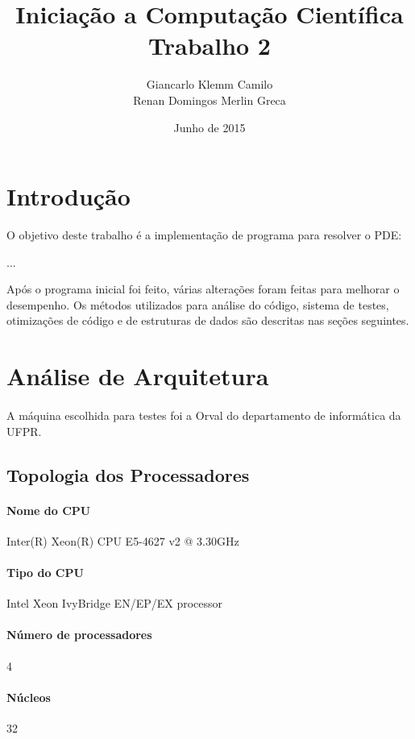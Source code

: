 \documentclass[12pt]{article}
\title{Iniciação a Computação Científica\\Trabalho 2}
\author{
	Giancarlo Klemm Camilo \\
	Renan Domingos Merlin Greca
}
\date{Junho de 2015}
\begin{document}
\maketitle
\newpage	

\tableofcontents
\newpage

\section{Introdução}
O objetivo deste trabalho é a implementação de programa para resolver o PDE:

...

Após o programa inicial foi feito, várias alterações foram feitas para melhorar o desempenho. Os métodos utilizados para análise do código, sistema de testes, otimizações de código e de estruturas de dados são descritas nas seções seguintes.

\newpage

\section{Análise de Arquitetura}
\paragraph{}
A máquina escolhida para testes foi a Orval do departamento de informática da UFPR.

\subsection{Topologia dos Processadores}
\paragraph{Nome do CPU} Inter(R) Xeon(R) CPU E5-4627 v2 @ 3.30GHz
\paragraph{Tipo do CPU} Intel Xeon IvyBridge EN/EP/EX processor
\paragraph{Número de processadores} 4
\paragraph{Núcleos} 32
\end{document}
